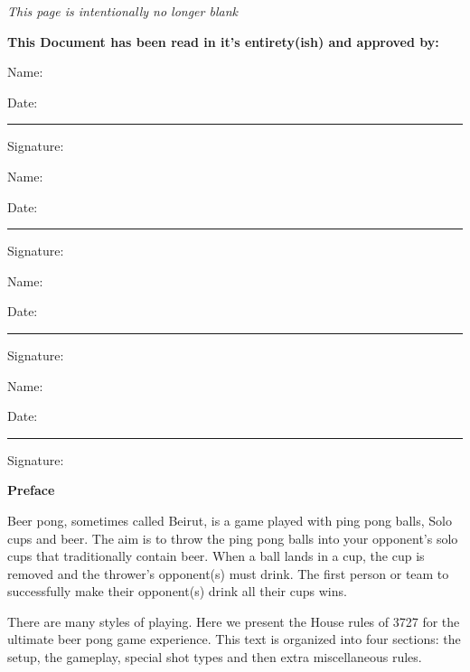 \documentclass[11pt, oneside,letterpaper]{article}
\begin{document}


\newpage\thispagestyle{empty}
\emph{This page is intentionally no longer blank}

\newpage\thispagestyle{empty}
\textbf{This Document has been read in it's entirety(ish) and approved by: }

\vspace{1.5cm}
\noindent Name: \hrulefill

\vspace{1cm}
\noindent Date: \rule{1.5in}{0.5pt} Signature: \hrulefill 

\vspace{1.5cm}
\noindent Name: \hrulefill

\vspace{1cm}
\noindent Date: \rule{1.5in}{0.5pt} Signature: \hrulefill

\vspace{1.5cm}
\noindent Name: \hrulefill 

\vspace{1cm}
\noindent Date: \rule{1.5in}{0.5pt} Signature: \hrulefill

\vspace{1.5cm}
\noindent Name: \hrulefill

\vspace{1cm}
\noindent Date: \rule{1.5in}{0.5pt} Signature: \hrulefill 

\newpage\thispagestyle{empty}
\tableofcontents \thispagestyle{empty}
\newpage

\setcounter{page}{1} %
\begin{center}
    \textbf{Preface}
\end{center}
    Beer pong, sometimes called Beirut, is a game played with ping pong balls, Solo cups and beer.
    The aim is to throw the ping pong balls into your opponent's solo cups that traditionally contain beer.
    When a ball lands in a cup, the cup is removed and the thrower's opponent(s) must drink.
    The first person or team to successfully make their opponent(s) drink all their cups wins.

    There are many styles of playing.
    Here we present the House rules of 3727 for the ultimate beer pong game experience. 
    This text is organized into four sections: the setup, the gameplay, special shot types and then extra miscellaneous rules.







\end{document}
